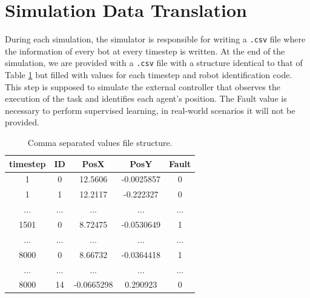 \documentclass[../../Thesis.tex]{subfiles}
\begin{document}
	\section{Simulation Data Translation}
	\label{sec:dataset_construction} %
		During each simulation, the simulator is responsible for writing a \verb|.csv| file where the information of every bot at every timestep is written. At the end of the simulation, we are provided with a \verb|.csv| file with a structure identical to that of Table \ref{tab:csv_file_structure} but filled with values for each timestep and robot identification code. This step is supposed to simulate the external controller that observes the execution of the task and identifies each agent's position. The Fault value is necessary to perform supervised learning, in real-world scenarios it will not be provided.
		\begin{table}[H]
		\centering 
		    \begin{tabular}{| c | c | c | c | c |}
			    \hline
				\rowcolor{bluepoli!40}
				\textbf{timestep} & \textbf{ID} & \textbf{PosX} & \textbf{PosY} & \textbf{Fault} \T\B \\
			    \hline \hline
			    1 & 0 & 12.5606 & -0.0025857 & 0 \T\B\\
			    1 & 1 & 12.2117 & -0.222327 & 0 \T\B\\
			    $\dots$ & $\dots$ & $\dots$ & $\dots$ & $\dots$ \T\B\\
			    1501 & 0 & 8.72475 & -0.0530649 & 1 \T\B\\
			    $\dots$ & $\dots$ & $\dots$ & $\dots$ & $\dots$ \T\B\\
			    8000 & 0 & 8.66732 & -0.0364418 & 1 \T\B\\
			    $\dots$ & $\dots$ & $\dots$ & $\dots$ & $\dots$ \T\B\\
			    8000 & 14 & -0.0665298 & 0.290923 & 0 \T\B\\
			    \hline
		    \end{tabular}
		    \\[10pt]
		    \caption{Comma separated values file structure.}
		    \label{tab:csv_file_structure}
		\end{table}
		
\end{document}
